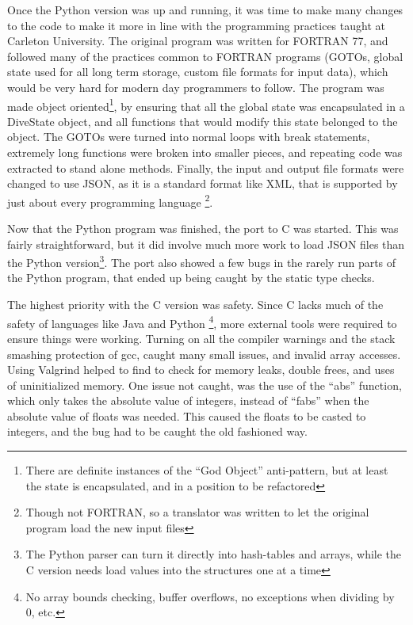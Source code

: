 \documentclass[12pt]{article}
\begin{document}
 Once the Python version was up and running, it was time to make many changes to the code to make it more
in line with the programming practices taught at Carleton University. The original program was written for FORTRAN 77,
and followed many of the practices common to FORTRAN programs (GOTOs, global state used for all long term storage,
custom file formats for input data), which would be very hard for modern day programmers to follow. The program
was made object oriented\footnote{There are definite instances of the ``God Object'' anti-pattern, but at least the state is encapsulated, and in a position to be refactored}, by ensuring that all the global state was encapsulated in a DiveState object, and all functions that would modify this state belonged to the object.
The GOTOs were turned into normal loops with break statements, extremely long functions were broken into smaller
pieces, and repeating code was extracted to stand alone methods. Finally,  the input and output file formats were changed
to use JSON,
 as it is a standard format like XML, that is supported by just about every programming language \footnote{Though not FORTRAN, so a translator was written to let the original program load the new input files}.

 Now that the Python program was finished, the port to C
 was started. This was fairly straightforward, but it did involve
much more work to load JSON files than the Python version\footnote{The Python parser can turn it 
directly into hash-tables and arrays, while the C version
needs load values into the structures one at a time}. The port also showed a few bugs in the rarely run parts
of the Python program, that ended up being caught by the static type checks.

The highest priority with the C version was safety. Since C lacks much of the safety of languages
like Java and Python \footnote{No array bounds checking, buffer overflows, no exceptions when dividing by 0, etc.}, more
external tools were required to ensure things were working. Turning on all the compiler warnings and the stack
smashing protection of gcc, caught many small issues, and invalid array accesses. Using Valgrind helped to find
to check for memory leaks, double frees, and uses of uninitialized memory. One issue not caught, was the use
of the ``abs'' function, which only takes the absolute value of integers, instead of ``fabs'' when the absolute value of floats was needed. This caused the floats to be casted to integers, and the bug had to be caught the old fashioned way.
\end{document}
